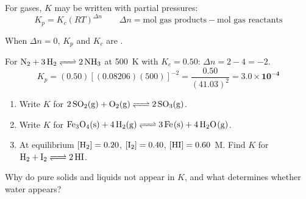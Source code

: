 \documentclass{apchem-notes}
\begin{document}

For gases, $K$ may be written with partial pressures:
\[ K_p = K_c(RT)^{\Delta n} \qquad
   \Delta n = \text{mol gas products} - \text{mol gas reactants} \]

When $\Delta n = 0$, $K_p$ and $K_c$ are .

\begin{workedexample}
For $\ce{N2 + 3H2 <=> 2NH3}$ at \SI{500}{\kelvin} with
$K_c = 0.50$: $\Delta n = 2 - 4 = -2$.
\[ K_p = (0.50)[(0.08206)(500)]^{-2} = \frac{0.50}{(41.03)^2}
   = \mathbf{3.0\times10^{-4}} \]
\end{workedexample}


\begin{enumerate}[leftmargin=*,itemsep=0.4em]
  \item Write $K$ for $\ce{2SO2(g) + O2(g) <=> 2SO3(g)}$.
  \item Write $K$ for $\ce{Fe3O4(s) + 4H2(g) <=> 3Fe(s) + 4H2O(g)}$.
  \item At equilibrium $[\ce{H2}] = 0.20$, $[\ce{I2}] = 0.40$,
        $[\ce{HI}] = 0.60$~M. Find $K$ for
        $\ce{H2 + I2 <=> 2HI}$. \workspace[2cm]
\end{enumerate}

\begin{exitticket}
Why do pure solids and liquids not appear in $K$, and what determines
whether water appears?
\end{exitticket}

\end{document}
